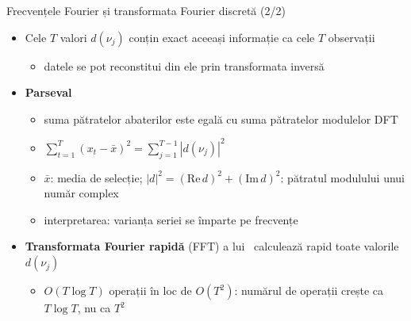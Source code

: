 \begin{frame}{Frecvențele Fourier și transformata Fourier discretă (2/2)}
\itemsize{\small}
\begin{itemize}
    \item Cele $T$ valori $d(\nu_j)$ conțin exact aceeași informație ca cele $T$ observații
    \begin{itemize}
        \item datele se pot reconstitui din ele prin transformata inversă
    \end{itemize}
    \item \textbf{Parseval}
    \begin{itemize}
        \item suma pătratelor abaterilor este egală cu suma pătratelor modulelor DFT
        \item $\sum_{t=1}^{T}(x_t - \bar x)^2 = \sum_{j=1}^{T-1}|d(\nu_j)|^2$
        \item $\bar x$: media de selecție; $|d|^2 = (\mathrm{Re}\,d)^2 + (\mathrm{Im}\,d)^2$: pătratul modulului unui număr complex
        \item interpretarea: varianța seriei se împarte pe frecvențe
    \end{itemize}
    \item \textbf{Transformata Fourier rapidă} (FFT) a lui \ calculează rapid toate valorile $d(\nu_j)$
    \begin{itemize}
        \item $O(T\log T)$ operații în loc de $O(T^2)$: numărul de operații crește ca $T\log T$, nu ca $T^2$
    \end{itemize}
\end{itemize}
\end{frame}

